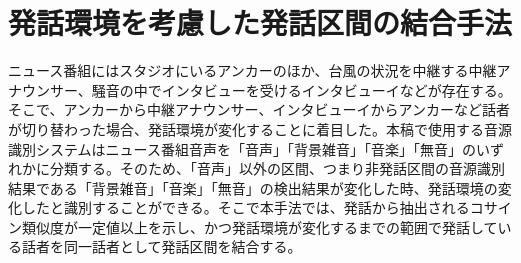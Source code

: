 \section{発話環境を考慮した発話区間の結合手法}
\label{prob2}
ニュース番組にはスタジオにいるアンカーのほか、台風の状況を中継する中継アナウンサー、騒音の中でインタビューを受けるインタビューイなどが存在する。そこで、アンカーから中継アナウンサー、インタビューイからアンカーなど話者が切り替わった場合、発話環境が変化することに着目した。本稿で使用する音源識別システムはニュース番組音声を「音声」「背景雑音」「音楽」「無音」のいずれかに分類する。そのため、「音声」以外の区間、つまり非発話区間の音源識別結果である「背景雑音」「音楽」「無音」の検出結果が変化した時、発話環境の変化したと識別することができる。そこで本手法では、発話から抽出されるコサイン類似度が一定値以上を示し、かつ発話環境が変化するまでの範囲で発話している話者を同一話者として発話区間を結合する。\par
